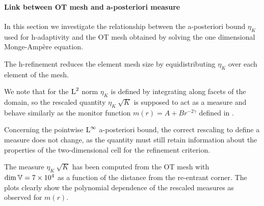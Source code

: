 \documentclass[a4paper,11pt]{article}
\begin{document}
\paragraph{Link between OT mesh and a-posteriori measure}

In this section we investigate the relationship between the a-posteriori bound $\eta_{K}$ used for h-adaptivity and the OT mesh obtained by solving the one dimensional Monge-Ampère equation.

The h-refinement reduces the element mesh size by equidistributing $\eta_{K}$ over each element of the mesh.

We note that for the $\operatorname L^{2}$ norm $\eta_{K}$ is defined by integrating along facets of the domain, so the rescaled quantity $\eta_{K} \ \sqrt{K}$ is supposed to act as a measure and behave similarly as the monitor function $m(r) = A + B r^{-2\gamma}$ defined in \label{sec:sol_MA}.


Concerning the pointwise $\operatorname L^{\infty}$ a-posteriori bound, the correct rescaling to define a measure does not change, as the quantity must still retain information about the properties of the two-dimensional cell for the refinement criterion.

The measure $\eta_{K} \ \sqrt{K}$ has been computed from the OT mesh with $\dim \mathbb V = 7 \times 10^{4}$ as a function of the distance from the re-entrant corner. The plots clearly show the polynomial dependence of the rescaled measures as observed for $m(r)$.
 
\end{document}
